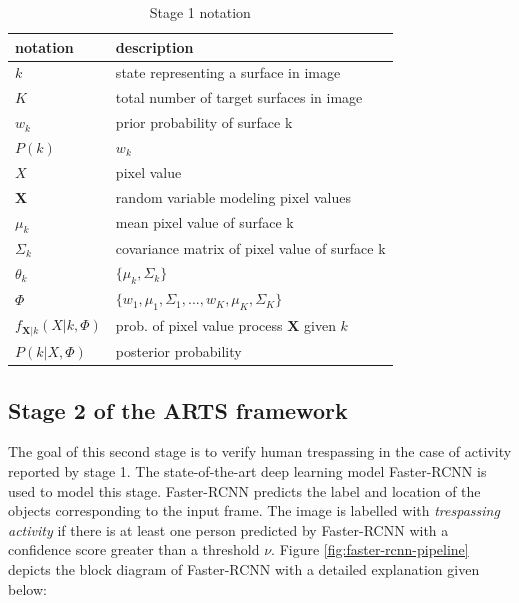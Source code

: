 \begin{table}
\caption{Stage 1 notation}
\label{table:stage1-notation}
\begin{tabular}{| l | l |} \hline

notation                 & description                                   \\ \hline \hline
$k$                      & state representing a surface in image         \\ \hline
$K$                      & total number of target surfaces in image      \\ \hline
$w_k$                    & prior probability of surface k                \\ \hline
$P(k)$                   & $w_k$                                         \\ \hline
$X$                      & pixel value                                   \\ \hline
$\mathbf{X}$             & random variable modeling pixel values         \\ \hline        
$\mu_k$                  & mean pixel value of surface k                 \\ \hline
$\Sigma_k$               & \small covariance matrix of pixel value of surface k \\ \hline
$\theta_k$               & $\{ \mu_k, \Sigma_k \}$                       \\ \hline
$\Phi $                  & $ \{w_1, \mu_1, \Sigma_1,..., w_K, \mu_K, \Sigma_K \}$     \\ \hline
$f_{\mathbf{X}|k}(X|k,\Phi)$    & prob. of pixel value process $\mathbf{X}$ given $k$     \\ \hline
$P(k|X,\Phi)$            & posterior probability                          \\ \hline
\end{tabular}
\end{table}


\subsection{Stage 2 of the ARTS framework}
\label{sec:stage2}
The goal of this second stage is to verify human trespassing in the case of activity reported by stage 1. The state-of-the-art deep learning model Faster-RCNN\cite{ref_fasterrcnn} is used to model this stage. Faster-RCNN predicts the label and location of the objects corresponding to the input frame. The image is labelled with \textit{trespassing activity} if there is at least one person predicted by Faster-RCNN with a confidence score greater than a threshold $\nu$. Figure \ref{fig:faster-rcnn-pipeline} depicts the block diagram of Faster-RCNN with a detailed explanation given below: 


